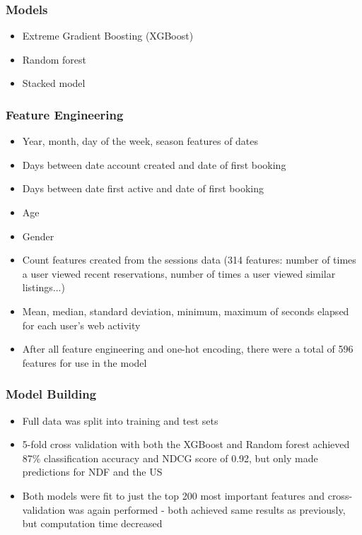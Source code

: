 \documentclass{beamer}
\begin{document}
\begin{frame}
\frametitle{Models}
  \begin{itemize}
    \item Extreme Gradient Boosting (XGBoost)
    \item Random forest
    \item Stacked model
  \end{itemize}
\end{frame}


\begin{frame}
\frametitle{Feature Engineering}
\begin{itemize}
  \item Year, month, day of the week, season features of dates 
  \item Days between date account created and date of first booking
  \item Days between date first active and date of first booking
  \item Age
  \item Gender
  \item Count features created from the sessions data (314 features: number of times a user viewed recent reservations, number of times a user viewed similar listings...)
  \item Mean, median, standard deviation, minimum, maximum of seconds elapsed for each user’s web activity
  \item After all feature engineering and one-hot encoding, there were a total of 596 features for use in the model
\end{itemize}
\end{frame}

\begin{frame}
\frametitle{Model Building}
\begin{itemize}
  \item Full data was split into training and test sets
  \item 5-fold cross validation with both the XGBoost and Random forest achieved 87\% classification accuracy and NDCG score of 0.92, but only made predictions for NDF and the US
  \item Both models were fit to just the top 200 most important features and cross-validation was again performed - both achieved same results as previously, but computation time decreased 
\end{itemize}
\end{frame}
\end{document}
